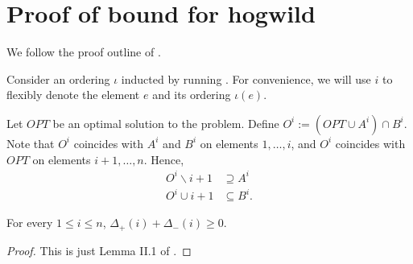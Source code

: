 \section{Proof of bound for hogwild}
\label{app:proofhogwild}


We follow the proof outline of \cite{buchbinder2012}.

Consider an ordering $\iota$ inducted by running \hogwild{}.
For convenience, we will use $i$ to flexibly denote the element $e$ and its ordering $\iota(e)$.

Let $OPT$ be an optimal solution to the problem.
Define $O^i := (OPT \cup A^i) \cap B^i$.
Note that $O^i$ coincides with $A^i$ and $B^i$ on elements $1,\dots,i$, and $O^i$ coincides with $OPT$ on elements $i+1,\dots, n$.
Hence,
\begin{align*}
O^i \backslash i+1 &\supseteq A^i\\
O^i \cup i+1 &\subseteq B^i.
\end{align*}

\begin{lem}\label{lem:positivesum} For every $1 \leq i \leq n$, $\Delta_+(i) + \Delta_-(i) \geq 0$.
\end{lem}
\begin{proof} This is just Lemma II.1 of \cite{buchbinder2012}.
\end{proof}

